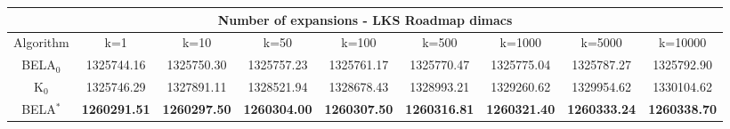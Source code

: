 \begin{tabular}{c|cccccccc}\toprule
\multicolumn{9}{c}{Number of expansions - LKS Roadmap dimacs}\\ \midrule
Algorithm & k=1 & k=10 & k=50 & k=100 & k=500 & k=1000 & k=5000 & k=10000 \\ \midrule
BELA$_0$ & 1325744.16 & 1325750.30 & 1325757.23 & 1325761.17 & 1325770.47 & 1325775.04 & 1325787.27 & 1325792.90 \\
K$_0$ & 1325746.29 & 1327891.11 & 1328521.94 & 1328678.43 & 1328993.21 & 1329260.62 & 1329954.62 & 1330104.62 \\
BELA$^*$ & \textbf{1260291.51} & \textbf{1260297.50} & \textbf{1260304.00} & \textbf{1260307.50} & \textbf{1260316.81} & \textbf{1260321.40} & \textbf{1260333.24} & \textbf{1260338.70} \\ \bottomrule 
\end{tabular}
